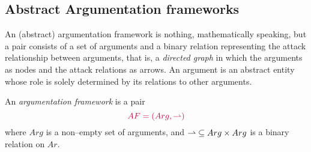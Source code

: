 










\subsection{Abstract Argumentation frameworks}
\label{subsec: abstract-argumentation-frameworks}


An (abstract) argumentation framework is nothing, 
mathematically speaking, 
but a pair consists of a set of arguments and a binary relation representing the attack relationship between arguments, 
that is, 
a \textit{directed graph} in which the arguments as nodes and the attack relations as arrows. 
% 
An argument is an abstract entity whose role is solely determined by its relations to other arguments.



\begin{df}
    An \textit{argumentation framework}  is a pair 
    \[
        {\color{purple} AF = (Arg,\rightharpoonup)}
    \]
    where $Arg$ is a non--empty set of arguments, 
    and $\rightharpoonup \;\subseteq Arg \times Arg$ is a binary relation on $Ar$.
\end{df}



